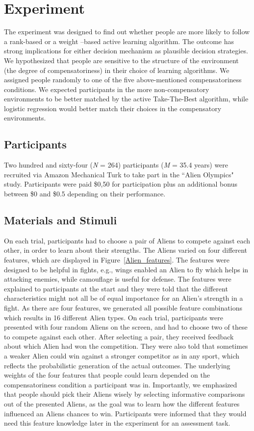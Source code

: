 \documentclass[10pt,letterpaper]{article}
\begin{document}
\section{Experiment}
The experiment was designed to find out whether people are more likely to follow a rank-based or a weight –based active learning algorithm. The outcome has strong implications for either decision mechanism as plausible decision strategies. We hypothesized that people are sensitive to the structure of the environment (the degree of compensatoriness) in their choice of learning algorithms. We assigned people randomly to one of the five above-mentioned compensatoriness conditions. We expected participants in the more non-compensatory environments to be better matched by the active Take-The-Best algorithm, while logistic regression would better match their choices in the compensatory environments.   

\subsection{Participants}
Two hundred and sixty-four (\textit{N} = 264) participants (\textit{M} = 35.4 years) were recruited via Amazon Mechanical Turk to take part in the ``Alien Olympics" study. Participants were paid \$0,50 for participation plus an additional bonus between \$0 and  \$0.5 depending on their performance. 
\subsection{Materials and Stimuli}
On each trial, participants had to choose a pair of Aliens to compete against each other, in order to learn about their strengths. The Aliens varied on four different features, which are displayed in Figure~\ref{Alien_features}. The features were designed to be helpful in fights, e.g., wings enabled an Alien to fly which helps in attacking enemies, while camouflage is useful for defense. The features were explained to participants at the start and they were told that the different characteristics might not all be of equal importance for an Alien's strength in a fight. As there are four features, we generated all possible feature combinations which results in 16 different Alien types. On each trial, participants were presented with four random Aliens on the screen, and had to choose two of these to compete against each other. After selecting a pair, they received feedback about which Alien had won the competition. They were also told that sometimes a weaker Alien could win against a stronger competitor as in any sport, which reflects the probabilistic generation of the actual outcomes. The underlying weights of the four features that people could learn depended on the compensatoriness condition a participant was in. Importantly, we emphasized that people should pick their Aliens wisely by selecting informative comparisons out of the presented Aliens, as the goal was to learn how the different features influenced an Aliens chances to win. Participants were informed that they would need this feature knowledge later in the experiment for an assessment task.
\end{document}
